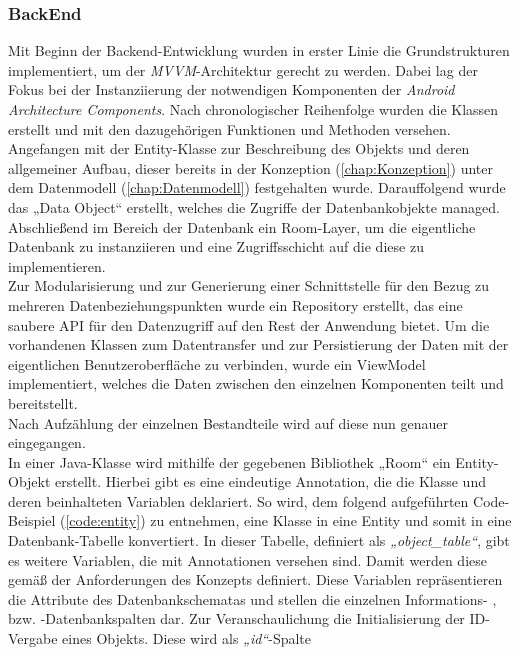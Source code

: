 \subsubsection{BackEnd}
Mit Beginn der Backend-Entwicklung wurden in erster Linie die Grundstrukturen implementiert, um der \textit{MVVM}-Architektur gerecht zu werden. Dabei lag 
der Fokus bei der Instanziierung der notwendigen Komponenten der \textit{Android Architecture Components}. Nach chronologischer Reihenfolge wurden die Klassen 
erstellt und mit den dazugehörigen Funktionen und Methoden versehen. Angefangen mit der Entity-Klasse zur Beschreibung des Objekts und deren allgemeiner Aufbau, 
dieser bereits in der Konzeption (\ref{chap:Konzeption}) unter dem Datenmodell (\ref{chap:Datenmodell}) festgehalten wurde. Darauffolgend wurde das „Data Object“ 
erstellt, welches die Zugriffe der Datenbankobjekte managed. Abschließend im Bereich der Datenbank ein Room-Layer, um die eigentliche Datenbank zu 
instanziieren und eine Zugriffsschicht auf die diese zu implementieren. 
\\ 
Zur Modularisierung und zur Generierung einer Schnittstelle für den Bezug zu mehreren Datenbeziehungspunkten wurde ein Repository erstellt, das eine saubere 
\acs{API} für den Datenzugriff auf den Rest der Anwendung bietet. Um die vorhandenen Klassen zum Datentransfer und zur Persistierung der Daten mit der 
eigentlichen Benutzeroberfläche zu verbinden, wurde ein ViewModel implementiert, welches die Daten zwischen den einzelnen Komponenten teilt und bereitstellt. 
\\ 
\linebreak 
Nach Aufzählung der einzelnen Bestandteile wird auf diese nun genauer eingegangen. 
\\ 
\linebreak
In einer Java-Klasse wird mithilfe der gegebenen Bibliothek „Room“ ein Entity-Objekt erstellt. Hierbei gibt es eine eindeutige Annotation, die die Klasse und 
deren beinhalteten Variablen deklariert. So wird, dem folgend aufgeführten Code-Beispiel (\ref{code:entity}) zu entnehmen, eine Klasse in eine Entity und somit 
in eine Datenbank-Tabelle konvertiert. In dieser Tabelle, definiert als \textit{„object\_table“}, gibt es weitere Variablen, die mit Annotationen versehen sind. 
Damit werden diese gemäß der Anforderungen des Konzepts definiert. Diese Variablen repräsentieren die Attribute des Datenbankschematas und stellen die einzelnen 
Informations- , bzw. -Datenbankspalten dar. Zur Veranschaulichung die Initialisierung der \acs{ID}-Vergabe eines Objekts. Diese wird als \textit{„id“}-Spalte 
